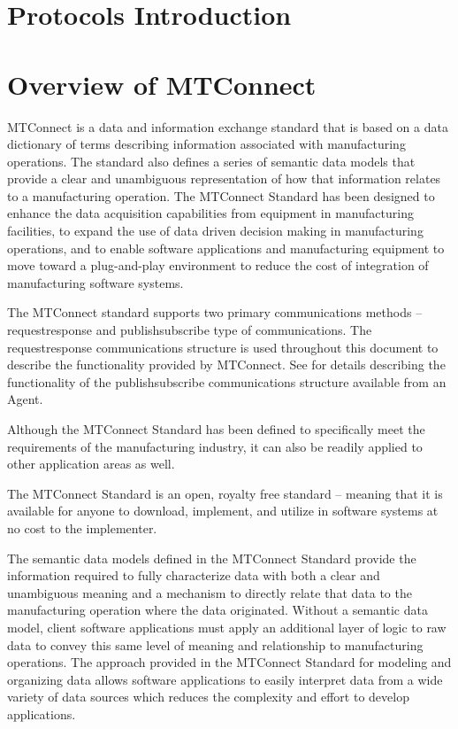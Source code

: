 
\section{Protocols Introduction}
\label{sec:Protocols Introduction}

\section{Overview of MTConnect}

MTConnect is a data and information exchange standard that is based on a \gls{data dictionary} of terms describing information associated with manufacturing operations.  The standard also defines a series of \glspl{semantic data model} that provide a clear and unambiguous representation of how that information relates to a manufacturing operation.  The MTConnect Standard has been designed to enhance the data acquisition capabilities from equipment in manufacturing facilities, to expand the use of data driven decision making in manufacturing operations, and to enable software applications and manufacturing equipment to move toward a plug-and-play environment to reduce the cost of integration of manufacturing software systems.

The MTConnect standard supports two primary communications methods – \gls{requestresponse} and \gls{publishsubscribe} type of communications.  The \gls{requestresponse} communications structure is used throughout this document to describe the functionality provided by MTConnect.  See  for details describing the functionality of the \gls{publishsubscribe} communications structure available from an \gls{Agent}. 

Although the MTConnect Standard has been defined to specifically meet the requirements of the manufacturing industry, it can also be readily applied to other application areas as well.

The MTConnect Standard is an open, royalty free standard – meaning that it is available for anyone to download, implement, and utilize in software systems at no cost to the implementer.

The \glspl{semantic data model} defined in the MTConnect Standard provide the information required to fully characterize data with both a clear and unambiguous meaning and a mechanism to directly relate that data to the manufacturing operation where the data originated.  Without a \gls{semantic data model}, client software applications must apply an additional layer of logic to raw data to convey this same level of meaning and relationship to manufacturing operations.  The approach provided in the MTConnect Standard for modeling and organizing data allows software applications to easily interpret data from a wide variety of data sources which reduces the complexity and effort to develop applications.

